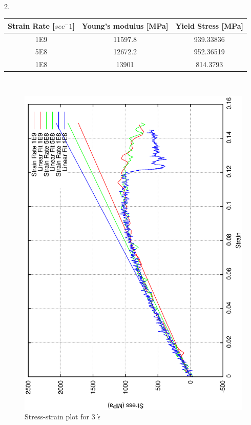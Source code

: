\documentclass{article}
\begin{document}
\\
2.
\begin{center}
\begin{tabular}{|c|c|c|}
  \hline
  Strain Rate [$sec^-1$] & Young's modulus [MPa] & Yield Stress [MPa] \\
  \hline
  1E9 & 11597.8   & 939.33836   \\ \hline
  5E8 & 12672.2   & 952.36519 \\ \hline
  1E8 & 13901    &  814.3793   \\ \hline
\end{tabular}
\end{center}\
\begin{figure}[h!]
\centering
\includegraphics[totalheight=0.5\textheight, angle=-90]{se_curve2}
\caption{Stress-strain plot for 3 $\dot{\epsilon}$ }
\label{fig:aNicePicture}
\end{figure}
\end{document}
